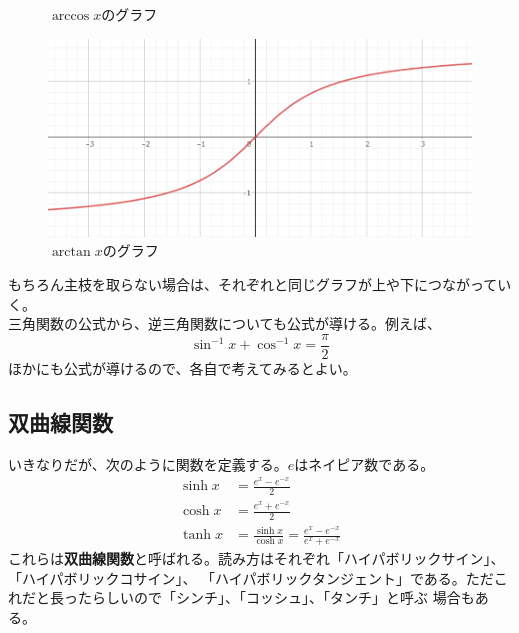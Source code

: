\documentclass[a4j,dvipdfmx]{jsarticle}
\begin{document}
\begin{figure}[h]
\begin{minipage}{5cm}
                        \caption{$\arccos x$のグラフ}
                    \end{minipage}
                    \begin{minipage}{5cm}
                        \centering
                        \includegraphics[keepaspectratio,scale=0.3]{img/QuuNote/ArctanFuncGraph.png}
                        \caption{$\arctan x$のグラフ}
                    \end{minipage}
                \end{figure}
                
                もちろん主枝を取らない場合は、それぞれと同じグラフが上や下につながっていく。\\

                三角関数の公式から、逆三角関数についても公式が導ける。例えば、
                \begin{equation}
                    \sin^{-1} x+\cos^{-1} x =\frac{\pi}{2}
                \end{equation}
                ほかにも公式が導けるので、各自で考えてみるとよい。
            \clearpage
            \subsection{双曲線関数}
                いきなりだが、次のように関数を定義する。$e$はネイピア数である。
                \begin{align}
                    \sinh x &= \frac{e^x - e^{-x}}{2}\\
                    \cosh x &= \frac{e^x + e^{-x}}{2}\\
                    \tanh x &= \frac{\sinh x}{\cosh x} = \frac{e^x - e^{-x}}{e^x + e^{-x}}
                \end{align}
                これらは\textbf{双曲線関数}と呼ばれる。読み方はそれぞれ「ハイパボリックサイン」、「ハイパボリックコサイン」、
                「ハイパボリックタンジェント」である。ただこれだと長ったらしいので「シンチ」、「コッシュ」、「タンチ」と呼ぶ
                場合もある。
\end{document}
